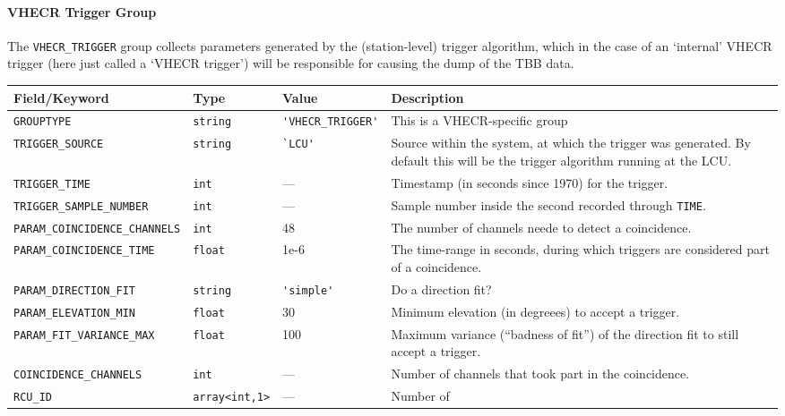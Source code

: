 \documentclass[a4paper,10pt,bibtotoc]{scrartcl}
\begin{document}
\paragraph{VHECR Trigger Group}
\label{sec:vhecr trigger group}

The \verb|VHECR_TRIGGER| group collects parameters generated by the
(station-level) trigger algorithm, which in the case of an `internal' VHECR trigger
(here just called a `VHECR trigger') will be responsible
for causing the dump of the TBB data.

\begin{table}[htbp]
  \centering
  \begin{tabular}{|lllp{5.5cm}|}
    \hline
    \sc Field/Keyword & \sc Type & \sc Value &  Description \\
    \hline \hline
    {\small\verb|GROUPTYPE|} & \verb|string| & {\small\verb|'VHECR_TRIGGER'|} & 
    This is a VHECR-specific group\\
    {\small\verb|TRIGGER_SOURCE|} & \verb|string| & \verb|`LCU'| &
    Source within the system, at which the trigger was generated. By
    default this will be the trigger algorithm running at the LCU. \\
    {\small\verb|TRIGGER_TIME|}  & \verb|int| & --- & Timestamp (in
    seconds since 1970) for the trigger. \\
    {\small\verb|TRIGGER_SAMPLE_NUMBER|} & \verb|int| & --- & Sample number inside the
    second recorded through \verb|TIME|. \\
   {\small\verb|PARAM_COINCIDENCE_CHANNELS|} & \verb|int| & 48 & The number
    of channels neede to detect a coincidence. \\
    {\small\verb|PARAM_COINCIDENCE_TIME|} & \verb|float| & 1e-6 & The
    time-range in seconds, during which triggers are considered part
    of a coincidence. \\
    {\small\verb|PARAM_DIRECTION_FIT|} & \verb|string| & \verb|'simple'| & Do
    a direction fit? \\
    {\small\verb|PARAM_ELEVATION_MIN|} & \verb|float| & 30 & Minimum
    elevation (in degreees) to accept a trigger. \\
    {\small\verb|PARAM_FIT_VARIANCE_MAX|} & \verb|float| & 100 &
    Maximum variance (``badness of fit'') of the direction fit to
    still accept a trigger. \\
   {\small\verb|COINCIDENCE_CHANNELS|} & \verb|int|  & --- & Number of channels
    that took part in the coincidence. \\
    {\small\verb|RCU_ID|} & \verb|array<int,1>| & --- & Number of

\end{tabular}
\end{table}
\end{document}

